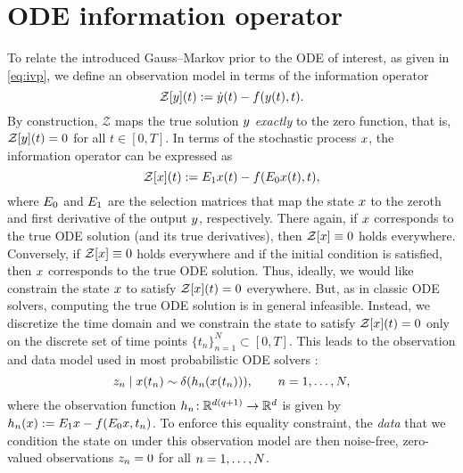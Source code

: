 \documentclass{mimosis}
\begin{document}
\section{ODE information operator}
\label{sec:org0e41312}
\label{sec:ode-filters:information-operator}
To relate the introduced Gauss--Markov prior to the ODE of interest,
as given in \cref{eq:ivp},
we define an observation model in terms of the information operator
\parencite{cockayne17_bayes_probab_numer_method,tronarp20_bayes_ode_solver}
\begin{equation}
  \mathcal{Z}[\val](t) := \dot{\val}(t) - \vf(\val(t),t).
\end{equation}
By construction,
\(\mathcal{Z}\) maps the true solution \(y\) \emph{exactly} to the zero function, that is, \(\mathcal{Z}[y](t) = 0\) for all \(t \in [0, T]\).
In terms of the stochastic process \(x\), the information operator can be expressed as
\begin{equation}
  \mathcal{Z}[\st](t) := \proj{1} \st(t) - \vf(\proj{0} \st(t),t),
\end{equation}
where \(E_{0}\) and \(E_{1}\) are the selection matrices that map the state \(x\) to the zeroth and first derivative of the output \(y\), respectively.
There again, if \(x\) corresponds to the true ODE solution (and its true derivatives), then \(\mathcal{Z}[x] \equiv 0\) holds everywhere.
Conversely, if \(\mathcal{Z}[x] \equiv 0\) holds everywhere and if the initial condition is satisfied, then \(x\) corresponds to the true ODE solution.
Thus, ideally, we would like constrain the state \(x\) to satisfy \(\mathcal{Z}[x](t) = 0\) everywhere.
But, as in classic ODE solvers, computing the true ODE solution is in general infeasible.
Instead, we discretize the time domain and we constrain the state to satisfy \(\mathcal{Z}[x](t) = 0\) only on the discrete set of time points \(\{t_n\}_{n=1}^N \subset [0, T]\).
This leads to the observation and data model used in most probabilistic ODE solvers
\parencite{tronarp18_probab_solut_to_ordin_differ}:
\begin{equation}
  \label{eq:odefilter:obsmod}
  \obs_\idxt \mid \st(t_\idxt) \sim \dirac(\obsh_\idxt \left( \st(t_\idxt) \right) ), \qquad \idxt = 1, \dots, N,
\end{equation}
where the observation function
\(h_n\!: \mathbb{R}^{d(q+1)} \to \mathbb{R}^{d}\)
is given by
\(\obsh_\idxt(\st) := \proj{1} \st - \vf(\proj{0} \st, t_\idxt)\).
To enforce this equality constraint, the \emph{data} that we condition the state on under this observation model are then noise-free, zero-valued observations \(z_n = 0\) for all \(n = 1, \dots, N\).
\end{document}
